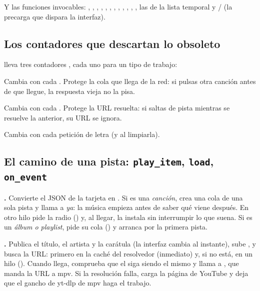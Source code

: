 Y las funciones invocables: , , ,
, , , , , ,
, , , las de la lista temporal
y  /  (la precarga que dispara la interfaz).

\subsection{Los contadores que descartan lo obsoleto}

 lleva tres contadores , cada uno para un tipo de trabajo:

\begin{description}[style=nextline, leftmargin=0pt]
  \item[\cod{request}] Cambia con cada . Protege la cola que llega de la red:
  si pulsas otra canción antes de que llegue, la respuesta vieja no la pisa.
  \item[\cod{load_token}] Cambia con cada . Protege la URL resuelta: si saltas de
  pista mientras se resuelve la anterior, su URL se ignora.
  \item[\cod{lyrics_token}] Cambia con cada petición de letra (y al limpiarla).
\end{description}

\subsection{El camino de una pista: \texttt{play\_item}, \texttt{load}, \texttt{on\_event}}

\textbf{.} Convierte el JSON de la tarjeta en . Si es una
\emph{canción}, crea una cola de una sola pista y llama a  \emph{ya}: la música
empieza antes de saber qué viene después. En otro hilo pide la radio () y, al
llegar,  la instala sin interrumpir lo que suena. Si es un \emph{álbum o
playlist}, pide su cola () y arranca por la primera pista.

\textbf{.} Publica el título, el artista y la carátula (la interfaz cambia
al instante), sube , y busca la URL: primero en la caché del resolvedor
(inmediato) y, si no está, en un hilo (). Cuando llega, comprueba que el
 siga siendo el mismo y llama a , que manda la URL a mpv.
Si la resolución falla,  carga la página de YouTube y deja que
el gancho de yt-dlp de mpv haga el trabajo.

